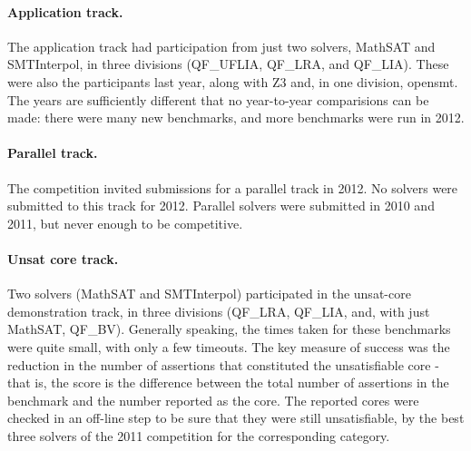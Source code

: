 \documentclass{llncs}
\begin{document}
\paragraph{Application track.}

The application track had participation from just two solvers, MathSAT and SMTInterpol, in three divisions (QF\_UFLIA, QF\_LRA, and QF\_LIA). These were also the participants last year, along with Z3 and, in one division, opensmt. The years are sufficiently different that no year-to-year comparisions can be made: there were many new benchmarks, and more benchmarks were run in 2012. 

\paragraph{Parallel track.} The competition invited submissions for a parallel track in 2012. No solvers were submitted to this track for 2012.  Parallel solvers were submitted in 2010 and 2011, but never enough to be competitive.

\paragraph{Unsat core track.} Two solvers (MathSAT and SMTInterpol) participated in the unsat-core demonstration track, in three divisions (QF\_LRA, QF\_LIA, and, with just MathSAT, QF\_BV). Generally speaking, the times taken for these benchmarks were quite small, with only a few timeouts. The key measure of success was the reduction in the number of assertions that constituted the unsatisfiable core - that is, the score is the difference between the total number of assertions in the benchmark and the number reported as the core. The reported cores were checked in an off-line step to be sure that they were still unsatisfiable, by the best three solvers of the 2011 competition for
the corresponding category.
\end{document}
